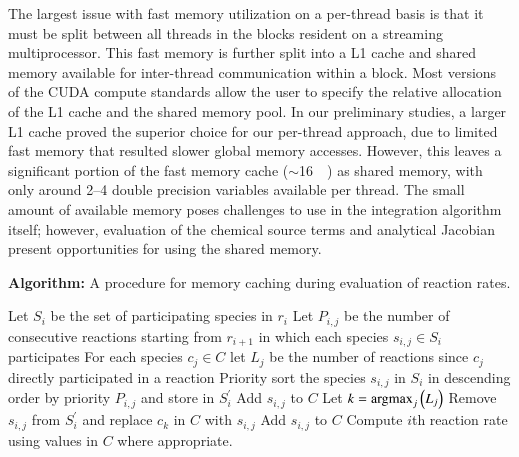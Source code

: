 \documentclass[preprint]{elsarticle}
\newcommand{\argmax}{\operatornamewithlimits{argmax}}
\begin{document}
The largest issue with fast memory utilization on a per-thread basis is that it must be split between all threads in the blocks resident on a streaming multiprocessor.
This fast memory is further split into a L1 cache and shared memory available for inter-thread communication within a block.
Most versions of the CUDA compute standards allow the user to specify the relative allocation of the L1 cache and the shared memory pool.
In our preliminary studies, a larger L1 cache proved the superior choice for our per-thread approach, due to limited fast memory that resulted slower global memory accesses.
However, this leaves a significant portion of the fast memory cache ($\sim$\SI{16}{\kilo\byte}) as shared memory, with only around \numrange{2}{4} double precision variables available per thread.
The small amount of available memory poses challenges to use in the integration algorithm itself; however, evaluation of the chemical source terms and analytical Jacobian present opportunities for using the shared memory.

\begin{algorithm}[htb]
\caption{\textbf{Algorithm:} A procedure for memory caching during evaluation of reaction rates.\label{A:shared_mem_caching}}
\begin{algorithmic}[0]
    \State Let $S_i$ be the set of participating species in $r_i$
    \State Let $P_{i,j}$ be the number of consecutive reactions starting from $r_{i + 1}$ in which each species $s_{i,j} \in S_i$ participates
    \State For each species $c_j \in C$ let $L_j$ be the number of reactions since $c_j$ directly participated in a reaction
    \State Priority sort the species $s_{i,j}$ in $S_{i}$ in descending order by priority $P_{i,j}$ and store in $S_{i}^{\prime}$
		\State Add $s_{i,j}$ to $C$
	  \State Let $k = \argmax_j \left(L_j \right)$
	  \State Remove $s_{i,j}$ from $S_{i}^{\prime}$ and replace $c_k$ in $C$ with $s_{i,j}$
      \EndIf
    \EndFor
		\State Add $s_{i,j}$ to $C$
      \EndIf
    \EndFor
    \State Compute $i$th reaction rate using values in $C$ where appropriate.
  \EndFor
\end{algorithmic}
\end{algorithm}
\end{document}
